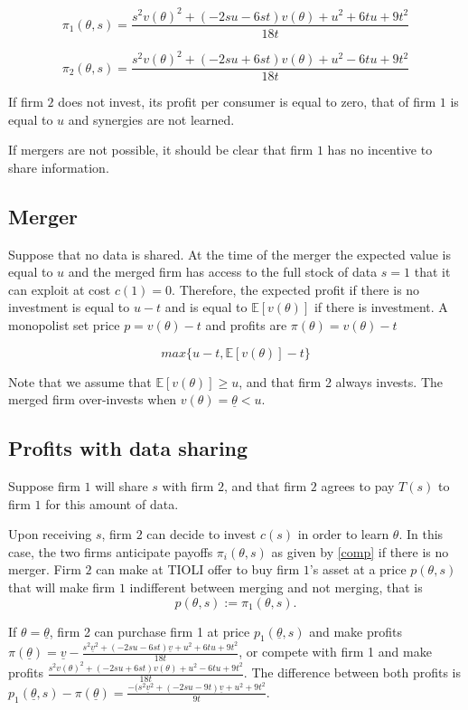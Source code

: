 \documentclass[a4paper,leqno]{article}%
\newcommand{\E}{\mathbb E}
\renewcommand{\t}{\theta}
\newcommand{\ut}{\underline \theta}
\newcommand{\uv}{\underline v}
\begin{document}
\begin{equation}
    \pi_1(\t,s)=\frac{s^2v(\t)^2+(-2su-6st)v(\t)+u^2+6tu+9t^2}{18t}
\end{equation}


\begin{equation}
    \pi_2(\t,s)=\frac{s^2v(\t)^2+(-2su+6st)v(\t)+u^2-6tu+9t^2}{18t}
\end{equation}


If firm $2$ does not invest, its profit per consumer is equal to zero, that of firm $1$ is equal to $u$ and synergies are not learned.

If mergers are not possible, it should be clear that firm $1$ has no incentive to share information. 


\subsection{Merger}
%
Suppose that no data is shared. At the time of the merger the expected value is equal to $u$ and the merged firm has access to the full stock of data $s=1$ that it can exploit at cost $c(1)=0$. Therefore, the expected profit if there is no investment is equal to $u-t$ and is equal to $\E[v(\t)]$ if there is investment. A monopolist set price $p=v(\t)-t$ and profits are $\pi(\t)=v(\t)-t$
%

$$max\{u-t, \E[v(\t)]-t\}$$

%
Note that we assume that $\E[v(\t)]\geq u$, and that firm 2 always invests. The merged firm over-invests when $v(\t)=\ut<u$.

\subsection{Profits with data sharing}

Suppose firm $1$ will share $s$ with firm $2$, and that firm $2$ agrees to pay $T(s)$ to firm $1$ for this amount of data. 

Upon receiving $s$, firm $2$ can decide to invest $c(s)$ in order to learn $\t$. In this case, the two firms anticipate payoffs $\pi_i(\t,s)$ as given by \eqref{comp} if there is no merger. Firm $2$ can make at TIOLI offer to buy firm $1$'s asset at a price $p(\t,s)$ that will make firm $1$ indifferent between merging and not merging, that is 
%
\begin{equation}\label{merger-price}
    p(\t,s):=\pi_1(\t,s).  
\end{equation}
%

If $\t=\ut$, firm 2 can purchase firm 1 at price $p_1(\ut,s)$ and make profits $\pi(\ut)=\uv-\frac{s^2\uv^2+(-2su-6st)\uv+u^2+6tu+9t^2}{18t}$, or compete with firm 1 and make profits $\frac{s^2v(\t)^2+(-2su+6st)v(\t)+u^2-6tu+9t^2}{18t}$. The difference between both profits is $p_1(\ut,s)-\pi(\ut)=\frac{-(s^2\uv^2+(-2su-9t)\uv+u^2+9t^2}{9t}$.
\end{document}

